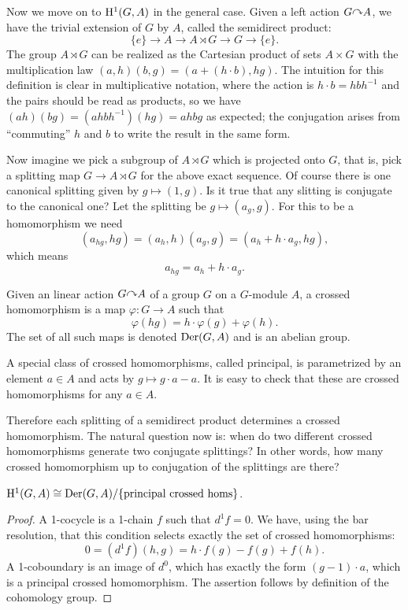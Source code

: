 Now we move on to $\mathrm{H}^1(G,A)$ in the general case. Given a left action $G\acts A$, we have the trivial extension of $G$ by $A$, called the semidirect product:
\[\{e\}\to A\to A\rtimes G \to G\to \{e\}.\]
The group $A\rtimes G$ can be realized as the Cartesian product of sets $A\times G$ with the multiplication law $(a,h)(b,g)=(a+(h\cdot b),hg)$. The intuition for this definition is clear in multiplicative notation, where the action is $h\cdot b=hbh^{-1}$ and the pairs should be read as products, so we have $(ah)(bg)=(ahbh^{-1})(hg)=ahbg$ as expected; the conjugation arises from ``commuting'' $h$  and $b$ to write the result in the same form.

Now imagine we pick a subgroup of $A\rtimes G$ which is projected onto $G$, that is, pick a splitting map $G\to A\rtimes G$ for the above exact sequence. Of course there is one canonical splitting given by $g\mapsto (1,g)$. Is it true that any slitting is conjugate to the canonical one? Let the splitting be $g\mapsto (a_g,g)$. For this to be a homomorphism we need
\[ (a_{hg},hg)=(a_h,h)(a_g,g)=(a_h +h\cdot a_g,hg),\]
which means
\[a_{hg}=a_h + h\cdot a_g.\]

\begin{defn}
    Given an linear action $G\acts A$ of a group $G$ on a $G$-module $A$, a crossed homomorphism is a map $\varphi:G\to A$ such that 
    \[\varphi(hg)=h\cdot \varphi(g)+\varphi(h).\]
    The set of all such maps is denoted $\operatorname{Der}(G,A)$ and is an abelian group.
\end{defn}
\begin{defn}
    A special class of crossed homomorphisms, called principal, is parametrized by an element $a\in A$ and acts by $g\mapsto g\cdot a-a$. It is easy to check that these are crossed homomorphisms for any $a\in A$.
\end{defn}

Therefore each splitting of a semidirect product determines a crossed homomorphism. The natural question now is: when do two different crossed homomorphisms generate two conjugate splittings? In other words, how many crossed homomorphism up to conjugation of the splittings are there?

\begin{thm}
$\mathrm{H}^1(G,A)\cong \operatorname{Der}(G,A)\slash \{\text{principal crossed homs}\}$.
\end{thm}
\begin{proof}
    A 1-cocycle is a 1-chain $f$ such that $d^1f=0$. We have, using the bar resolution, that this condition selects exactly the set of crossed homomorphisms:
    \[0=(d^1f)(h,g)=h\cdot f(g)-f(g)+f(h).\]
    A 1-coboundary is an image of $d^0$, which has exactly the form $(g-1)\cdot a$, which is a principal crossed homomorphism. The assertion follows by definition of the cohomology group.
\end{proof}


